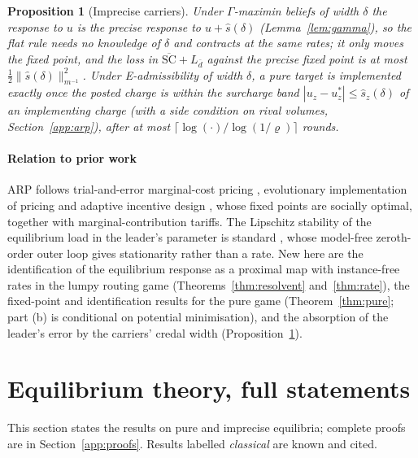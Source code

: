 \documentclass[preprint,11pt]{elsarticle}
\newtheorem{proposition}[theorem]{Proposition}
\theoremstyle{definition}
\theoremstyle{remark}
\begin{document}
\begin{proposition}[Imprecise carriers]\label{prop:arpcredal}
Under $\Gamma$-maximin beliefs of width $\delta$ the response to $u$ is the precise response to $u+\hat s(\delta)$ (Lemma~\ref{lem:gamma}), so the flat rule needs no knowledge of $\delta$ and contracts at the same rates; it only moves the fixed point, and the loss in $\overline{\mathrm{SC}}+L_{\bar d}$ against the precise fixed point is at most $\tfrac12\|\hat s(\delta)\|_{m^{-1}}^2$. Under E-admissibility of width $\delta$, a pure target is implemented exactly once the posted charge is within the surcharge band $|u_z-u^*_z|\le\hat s_z(\delta)$ of an implementing charge (with a side condition on rival volumes, Section~\ref{app:arp}), after at most $\lceil\log(\cdot)/\log(1/\varrho)\rceil$ rounds.
\end{proposition}

\paragraph{Relation to prior work} ARP follows trial-and-error marginal-cost pricing \citep{Yang2004,HanYang2009,YeYangTan2015}, evolutionary implementation of pricing \citep{Sandholm2002} and adaptive incentive design \citep{Maheshwari2022,Maheshwari2026}, whose fixed points are socially optimal, together with marginal-contribution tariffs. The Lipschitz stability of the equilibrium load in the leader's parameter is standard \citep[cf.][Lemma~2.6]{Masiha2026}, whose model-free zeroth-order outer loop gives stationarity rather than a rate. New here are the identification of the equilibrium response as a proximal map with instance-free rates in the lumpy routing game (Theorems~\ref{thm:resolvent} and~\ref{thm:rate}), the fixed-point and identification results for the pure game (Theorem~\ref{thm:pure}; part (b) is conditional on potential minimisation), and the absorption of the leader's error by the carriers' credal width (Proposition~\ref{prop:arpcredal}).



\section{Equilibrium theory, full statements}\label{sec:theory}

This section states the results on pure and imprecise equilibria; complete proofs are in Section~\ref{app:proofs}. Results labelled \emph{classical} are known and cited.
\end{document}
